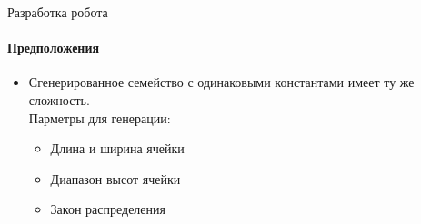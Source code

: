 \documentclass[aspectratio=169,xcolor=table]{beamer}
\begin{document}
\begin{frame}[t]{Разработка робота}
    \framesubtitle{Предположения}
    \large
    \begin{itemize}
        \item Сгенерированное семейство с одинаковыми константами имеет ту же сложность. 
        \\ 
        Парметры для генерации:
              \begin{itemize}
                \large
                  \item Длина и ширина ячейки
                  \item Диапазон высот ячейки
                  \item Закон распределения
              \end{itemize}
    \end{itemize}
\end{frame}
\end{document}
